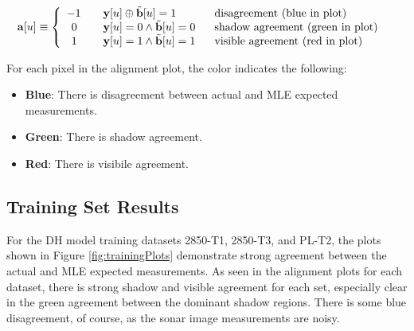 \begin{align}
\begin{split}
\mathbf{a}[u] &\equiv \left\{ 
  \begin{array}{l l}
    -1 & \quad \mathbf{y}[u] \oplus \tilde{\mathbf{b}}[u] = 1 \hspace{8ex} \text{disagreement (blue in plot)}\\
    \hspace{1ex}0 & \quad \mathbf{y}[u] = 0 \wedge \tilde{\mathbf{b}}[u] = 0 \hspace{4ex} \text{shadow agreement (green in plot)} \\
    \hspace{1ex}1 & \quad \mathbf{y}[u] = 1 \wedge \tilde{\mathbf{b}}[u] = 1 \hspace{4ex} \text{visible agreement (red in plot)}
  \end{array} \right.
\end{split}
 \label{eq:alignmentCalc}
\end{align}

\noindent For each pixel in the alignment plot, the color indicates the following:

\begin{itemize}
\item \textbf{Blue}: There is disagreement between actual and MLE expected measurements.
\item \textbf{Green}: There is shadow agreement.
\item \textbf{Red}: There is visibile agreement.
\end{itemize}

\subsection{Training Set Results}
\label{rov.Summary.Training}

For the DH model training datasets 2850-T1, 2850-T3, and PL-T2, the plots shown in Figure \ref{fig:trainingPlots} demonstrate strong agreement between the actual and MLE expected measurements. 
As seen in the alignment plots for each dataset, there is strong shadow and visible agreement for each set, especially clear in the green agreement between the dominant shadow regions.
There is some blue disagreement, of course, as the sonar image measurements are noisy.

